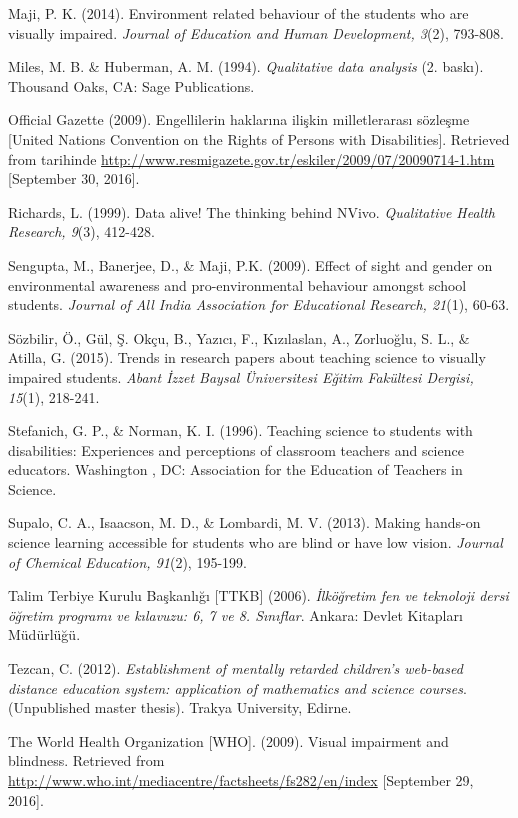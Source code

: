 \documentclass[11.5pt]{sig-alternate} %
\begin{document}
Maji, P. K. (2014). Environment related behaviour of the students who are visually impaired. \textit{Journal of Education and Human Development, 3}(2), 793-808.

Miles, M. B. \& Huberman, A. M. (1994). \textit{Qualitative data analysis} (2. baskı). Thousand Oaks, CA: Sage Publications.

Official Gazette (2009). Engellilerin haklarına ilişkin milletlerarası sözleşme [United Nations Convention on the Rights of Persons with Disabilities]. Retrieved from tarihinde \url{http://www.resmigazete.gov.tr/eskiler/2009/07/20090714-1.htm}  [September 30, 2016].

Richards, L. (1999). Data alive! The thinking behind NVivo. \textit{Qualitative Health Research, 9}(3), 412-428.

Sengupta, M., Banerjee, D., \& Maji, P.K. (2009). Effect of sight and gender on environmental awareness and pro-environmental behaviour amongst school students. \textit{Journal of All India Association for Educational Research, 21}(1), 60-63.

Sözbilir, Ö., Gül, Ş. Okçu, B., Yazıcı, F., Kızılaslan, A., Zorluoğlu, S. L., \& Atilla, G. (2015). Trends in research papers about teaching science to visually impaired students. \textit{Abant İzzet Baysal Üniversitesi Eğitim Fakültesi Dergisi, 15}(1), 218-241.

Stefanich, G. P., \& Norman, K. I. (1996). Teaching science to students with disabilities: Experiences and perceptions of classroom teachers and science educators. Washington , DC: Association for the Education of Teachers in Science.

Supalo, C. A., Isaacson, M. D., \& Lombardi, M. V. (2013). Making hands-on science learning accessible for students who are blind or have low vision. \textit{Journal of Chemical Education, 91}(2), 195-199.

Talim Terbiye Kurulu Başkanlığı [TTKB] (2006). \textit{İlköğretim fen ve teknoloji dersi öğretim programı ve kılavuzu: 6, 7 ve 8. Sınıflar}. Ankara: Devlet Kitapları Müdürlüğü.

Tezcan, C. (2012). \textit{Establishment of mentally retarded children's web-based distance education system: application of mathematics and science courses}. (Unpublished master thesis). Trakya University, Edirne.

The World Health Organization [WHO]. (2009). Visual impairment and blindness. Retrieved from \url{http://www.who.int/mediacentre/factsheets/fs282/en/index}  [September 29, 2016].
\end{document}
